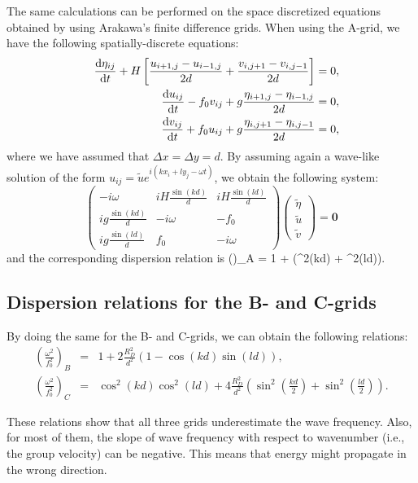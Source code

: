 The same calculations can be performed on the space discretized equations obtained by using Arakawa's finite difference grids. When using the A-grid, we have the following spatially-discrete equations:
\begin{eqnarray*}
	&&\frac{\mathop{\mathrm{{}d}}\mathopen{} \eta_{ij}}{\mathop{\mathrm{{}d}}\mathopen{} t} + H \left[ \frac{u_{i+1,j}-u_{i-1,j}}{2 d} + \frac{v_{i,j+1}-v_{i,j-1}}{2 d} \right] = 0,\\
	&&\frac{\mathop{\mathrm{{}d}}\mathopen{} u_{ij}}{\mathop{\mathrm{{}d}}\mathopen{} t} - f_0 v_{ij} + g \frac{\eta_{i+1,j}-\eta_{i-1,j}}{2 d} = 0, \\
	&&\frac{\mathop{\mathrm{{}d}}\mathopen{} v_{ij}}{\mathop{\mathrm{{}d}}\mathopen{} t} + f_0 u_{ij} + g \frac{\eta_{i,j+1}-\eta_{i,j-1}}{2 d} = 0, \\
\end{eqnarray*}
where we have assumed that $\Delta x = \Delta y = d$. By assuming again a wave-like solution of the form $u_{ij} = \tilde{u} e^{i(kx_i+ly_j-\omega t)}$, we obtain the following system:
\[
\left( \begin{array}{ccc}
	-i \omega & iH\frac{\sin(kd)}{d} & iH\frac{\sin(ld)}{d} \\
	ig\frac{\sin(kd)}{d} & -i \omega & -f_0 \\
	ig\frac{\sin(ld)}{d} & f_0 & -i \omega 
\end{array} \right )
\left( \begin{array}{c} \tilde{\eta} \\ \tilde{u} \\ \tilde{v} \end{array} \right)
= 
\mathbf{0}
\]
and the corresponding dispersion relation is
\BEQ \label{disp_A}
\left(\right)_A = 1 +  \left(\sin^2(kd) + \sin^2(ld)\right).
\EEQ


\subsection{Dispersion relations for the B- and C-grids}

By doing the same for the B- and C-grids, we can obtain the following relations:
\begin{eqnarray}
	\left(\frac{\omega^2}{f_0^2}\right)_B &=& 1 + 2\frac{R_D^2}{d^2} \left(1 - \cos(kd)\sin(ld)\right), \\
	\left(\frac{\omega^2}{f_0^2}\right)_C &=& \cos^2(kd)\cos^2(ld) + 4\frac{R_D^2}{d^2} \left(\sin^2(\frac{kd}{2}) + \sin^2(\frac{ld}{2})\right).
\end{eqnarray}

These relations show that all three grids underestimate the wave
frequency. Also, for most of them, the slope of wave frequency with
respect to wavenumber (i.e., the group velocity) can be negative. This
means that energy might propagate in the wrong direction. 


